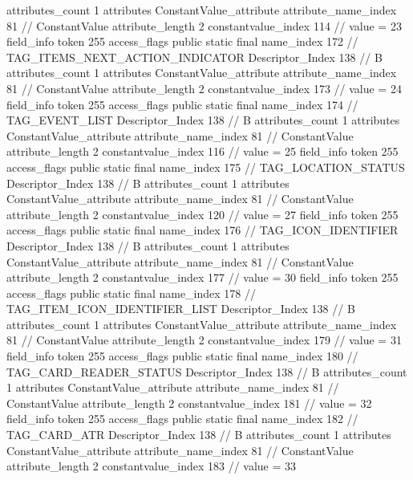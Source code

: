 {{{{{				attributes_count	1
				attributes {
				ConstantValue_attribute {
					attribute_name_index	81		// ConstantValue
					attribute_length	2
					constantvalue_index	114		// value = 23
				}
				}
			}
			field_info {
				token	255
				access_flags	public static final
				name_index	172		// TAG_ITEMS_NEXT_ACTION_INDICATOR
				Descriptor_Index	138		// B
				attributes_count	1
				attributes {
				ConstantValue_attribute {
					attribute_name_index	81		// ConstantValue
					attribute_length	2
					constantvalue_index	173		// value = 24
				}
				}
			}
			field_info {
				token	255
				access_flags	public static final
				name_index	174		// TAG_EVENT_LIST
				Descriptor_Index	138		// B
				attributes_count	1
				attributes {
				ConstantValue_attribute {
					attribute_name_index	81		// ConstantValue
					attribute_length	2
					constantvalue_index	116		// value = 25
				}
				}
			}
			field_info {
				token	255
				access_flags	public static final
				name_index	175		// TAG_LOCATION_STATUS
				Descriptor_Index	138		// B
				attributes_count	1
				attributes {
				ConstantValue_attribute {
					attribute_name_index	81		// ConstantValue
					attribute_length	2
					constantvalue_index	120		// value = 27
				}
				}
			}
			field_info {
				token	255
				access_flags	public static final
				name_index	176		// TAG_ICON_IDENTIFIER
				Descriptor_Index	138		// B
				attributes_count	1
				attributes {
				ConstantValue_attribute {
					attribute_name_index	81		// ConstantValue
					attribute_length	2
					constantvalue_index	177		// value = 30
				}
				}
			}
			field_info {
				token	255
				access_flags	public static final
				name_index	178		// TAG_ITEM_ICON_IDENTIFIER_LIST
				Descriptor_Index	138		// B
				attributes_count	1
				attributes {
				ConstantValue_attribute {
					attribute_name_index	81		// ConstantValue
					attribute_length	2
					constantvalue_index	179		// value = 31
				}
				}
			}
			field_info {
				token	255
				access_flags	public static final
				name_index	180		// TAG_CARD_READER_STATUS
				Descriptor_Index	138		// B
				attributes_count	1
				attributes {
				ConstantValue_attribute {
					attribute_name_index	81		// ConstantValue
					attribute_length	2
					constantvalue_index	181		// value = 32
				}
				}
			}
			field_info {
				token	255
				access_flags	public static final
				name_index	182		// TAG_CARD_ATR
				Descriptor_Index	138		// B
				attributes_count	1
				attributes {
				ConstantValue_attribute {
					attribute_name_index	81		// ConstantValue
					attribute_length	2
					constantvalue_index	183		// value = 33
				}
}}}}}}
